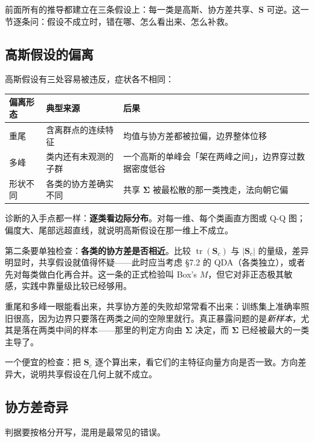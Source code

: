 \documentclass[11pt,a4paper,fontset=windows,zihao=-4]{ctexart}
\newcommand{\bS}{\mathbf{S}}
\newcommand{\bSigma}{\boldsymbol{\Sigma}}
\newcommand{\abs}[1]{\lvert #1\rvert}
\DeclareMathOperator{\tr}{tr}
\newcommand{\tabhead}{\sffamily\bfseries\color{navy}}
\begin{document}
前面所有的推导都建立在三条假设上：每一类是高斯、协方差共享、$\bS$ 可逆。这一节逐条问：假设不成立时，错在哪、怎么看出来、怎么补救。

\subsection{高斯假设的偏离}

高斯假设有三处容易被违反，症状各不相同：

\begin{center}
\small
\begin{tabular}{@{}p{2.9cm}p{4.4cm}p{5.2cm}@{}}
\toprule
\rowcolor{navy!7}
\tabhead 偏离形态 & \tabhead 典型来源 & \tabhead 后果\\
\midrule
重尾 & 含离群点的连续特征 & 均值与协方差都被拉偏，边界整体位移\\
多峰 & 类内还有未观测的子群 & 一个高斯的单峰会「架在两峰之间」，边界穿过数据密度低谷\\
形状不同 & 各类的协方差确实不同 & 共享 $\bSigma$ 被最松散的那一类拽走，法向朝它偏\\
\bottomrule
\end{tabular}
\end{center}

诊断的入手点都一样：\textbf{逐类看边际分布}。对每一维、每个类画直方图或 Q-Q 图；偏度大、尾部远超直线，就说明高斯假设在那一维上不成立。

第二条要单独检查：\textbf{各类的协方差是否相近}。比较 $\tr(\bS_c)$ 与 $\abs{\bS_c}$ 的量级，差异明显时，共享假设就值得怀疑——此时应当考虑 §7.2 的 QDA（各类独立），或者先对每类做白化再合并。这一条的正式检验叫 Box's $M$，但它对非正态极其敏感，实践中靠量级比较已经够用。

\begin{warn}[共享协方差的失败不显眼]
重尾和多峰一眼能看出来，共享协方差的失败却常常看不出来：训练集上准确率照旧很高，因为边界只要落在两类之间的空隙里就行。真正暴露问题的是\emph{新样本}，尤其是落在两类中间的样本——那里的判定方向由 $\bSigma$ 决定，而 $\bSigma$ 已经被最大的一类主导了。

一个便宜的检查：把 $\bS_c$ 逐个算出来，看它们的主特征向量方向是否一致。方向差异大，说明共享假设在几何上就不成立。
\end{warn}

\subsection{协方差奇异}

判据要按格分开写，混用是最常见的错误。
\end{document}
